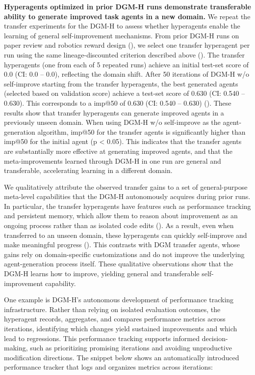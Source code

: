 \documentclass[]{fairmeta}
\begin{document}
\textbf{Hyperagents optimized in prior DGM-H runs demonstrate transferable ability to generate improved task agents in a new domain.}
We repeat the transfer experiments for the DGM-H to assess whether hyperagents enable the learning of general self-improvement mechanisms. From prior DGM-H runs on paper review and robotics reward design (), we select one transfer hyperagent per run using the same lineage-discounted criterion described above (). The transfer hyperagents (one from each of 5 repeated runs) achieve an initial test-set score of 0.0 (CI: 0.0 -- 0.0), reflecting the domain shift. After 50 iterations of DGM-H w/o self-improve starting from the transfer hyperagents, the best generated agents (selected based on validation score) achieve a test-set score of 0.630 (CI: 0.540 -- 0.630). This corresponds to a imp@50 of 0.630 (CI: 0.540 -- 0.630) (). These results show that transfer hyperagents can generate improved agents in a previously unseen domain. When using DGM-H w/o self-improve as the agent-generation algorithm, imp@50 for the transfer agents is significantly higher than imp@50 for the initial agent (p < 0.05). This indicates that the transfer agents are substantially more effective at generating improved agents, and that the meta-improvements learned through DGM-H in one run are general and transferable, accelerating learning in a different domain.

We qualitatively attribute the observed transfer gains to a set of general-purpose meta-level capabilities that the DGM-H autonomously acquires during prior runs. In particular, the transfer hyperagents have features such as performance tracking and persistent memory, which allow them to reason about improvement as an ongoing process rather than as isolated code edits (). As a result, even when transferred to an unseen domain, these hyperagents can quickly self-improve and make meaningful progress (). This contrasts with DGM transfer agents, whose gains rely on domain-specific customizations and do not improve the underlying agent-generation process itself. These qualitative observations show that the DGM-H learns how to improve, yielding general and transferable self-improvement capability.

One example is DGM-H's autonomous development of performance tracking infrastructure. Rather than relying on isolated evaluation outcomes, the hyperagent records, aggregates, and compares performance metrics across iterations, identifying which changes yield sustained improvements and which lead to regressions. This performance tracking supports informed decision-making, such as prioritizing promising iterations and avoiding unproductive modification directions. The snippet below shows an automatically introduced performance tracker that logs and organizes metrics across iterations:

\end{document}
